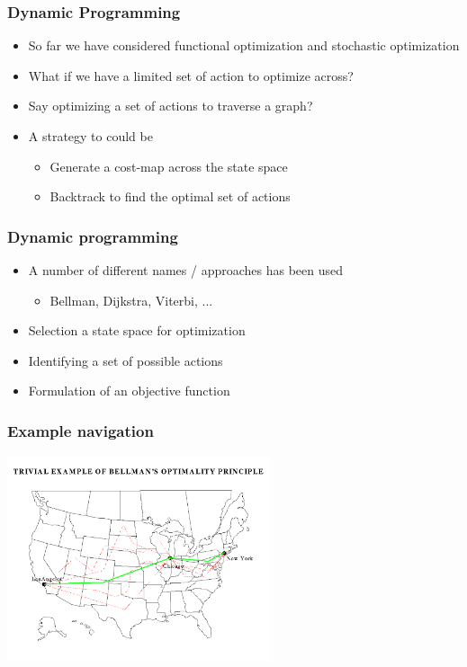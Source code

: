 \documentclass[10pt]{beamer}
\begin{document}
\begin{frame}
  \frametitle{Dynamic Programming}
  \begin{itemize}
  \item So far we have considered functional optimization and
    stochastic optimization
  \item What if we have a limited set of action to optimize across? 
  \item Say optimizing a set of actions to traverse a graph? 
  \item A strategy to could be
    \begin{itemize}
    \item Generate a cost-map across the state space
    \item Backtrack to find the optimal set of actions
    \end{itemize}
  \end{itemize}
\end{frame}

\begin{frame}
  \frametitle{Dynamic programming}
  \begin{itemize}
  \item A number of different names / approaches has been used
    \begin{itemize}
    \item Bellman, Dijkstra, Viterbi, ... 
    \end{itemize}
  \item Selection a state space for optimization
  \item Identifying a set of possible actions
  \item Formulation of an objective function
  \end{itemize}
\end{frame}

\begin{frame}
  \frametitle{Example navigation}
  \centerline{\includegraphics[height=6cm]{routing}}
\end{frame}
\end{document}
